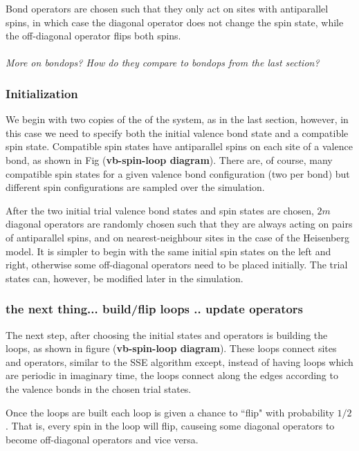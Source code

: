 \documentclass[prb,aps,twocolumn,floatfix,amsmath,amssymb,superscriptaddress,tightenlines]{revtex4}
\begin{document}
Bond operators are chosen such that they only act on sites with antiparallel spins, in which case the diagonal operator does not change the spin state, while the off-diagonal operator  flips both spins.
\\\\{\it More on bondops? How do they compare to bondops from the last section?}
\\

\subsubsection{Initialization}
We begin with two copies of the of the system, as in the last section, however, in this case we need to specify both the initial valence bond state and a compatible spin state.
Compatible spin states have antiparallel spins on each site of a valence bond, as shown in Fig ({\bf \!vb-spin-loop diagram}).  There are, of course, many compatible spin states for a given valence bond configuration (two per bond) but different spin configurations are sampled over the simulation.

After the two initial trial valence bond states and spin states are chosen, $2m$ diagonal operators are randomly chosen such that they are always acting on pairs of antiparallel spins, and on nearest-neighbour sites in the case of the Heisenberg model.
It is simpler to begin with the same initial spin states on the left and right, otherwise some off-diagonal operators need to be placed initially.
The trial states can, however, be modified later in the simulation.

\subsubsection{the next thing... build/flip loops .. update operators}

The next step, after choosing the initial states and operators is building the loops, as shown in figure ({\bf \!vb-spin-loop diagram}). 
These loops connect sites and operators, similar to the SSE algorithm except, instead of having loops which are periodic in imaginary time, the loops connect along the edges according to the valence bonds in the chosen trial states.

Once the loops are built each loop is given a chance to ``flip" with probability $1/2$.  That is, every spin in the loop will flip, causeing some diagonal operators to become off-diagonal operators and vice versa.  
\end{document}
